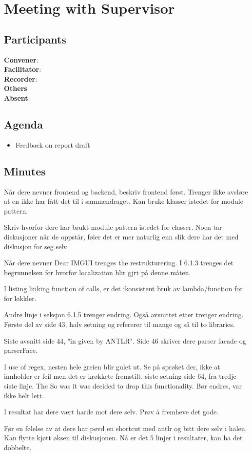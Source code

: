 \section*{Meeting with Supervisor}

\subsection*{Participants}

\textbf{Convener}: \supervisor{}        \\
\textbf{Facilitator}: \facilitator{}    \\
\textbf{Recorder}: \scrummaster{}       \\
\textbf{Others} \groupleader{}                    \\
\textbf{Absent}: 

\subsection*{Agenda}
\begin{itemize}
    \item Feedback on report draft

\end{itemize}

\subsection*{Minutes}

Når dere nevner frontend og backend, beskriv frontend først. Trenger ikke avsløre at en ikke har fått det til i sammendraget. Kan bruke klasser istedet for module pattern.

Skriv hvorfor dere har brukt module pattern istedet for classer. 
Noen tar diskusjoner når de oppstår, føler det er mer naturlig enn slik dere har det med diskusjon for seg selv. 

Når dere nevner Dear IMGUI trenges the restrukturering.
I 6.1.3 trenges det begrunnelsen for hvorfor localization blir gjrt på denne måten.

I listing linking function of calls, er det ikonsistent bruk av lambda/function for for løkkler.

Andre linje i seksjon 6.1.5 trenger endring. Også avsnittet etter trenger endring.
Første del av side 43, halv setning og refererer til mange og så til to libraries. 

Siste avsnitt side 44,  "in given by ANTLR".
Side 46 skriver dere parser facade og parserFace. 

I use of regex, nesten hele greien blir gulet ut. Se på sprøket der, ikke at innholder er feil men det er krøkkete fremstilt.
siste setning side 64, fra tredje siste linje. The So was it was decided to drop this functionality. Bør endres, var ikke helt lett. 

I resultat har dere vært harde mot dere selv. Prøv å fremheve det gode. 

Før en følelse av at dere har pøvd en shortcut med antlr og bitt dere selv i halen. 
Kan flytte kjøtt øksen til diskusjonen. Nå er det 5 linjer i resultater, kan ha det dobbelte. 
\newpage